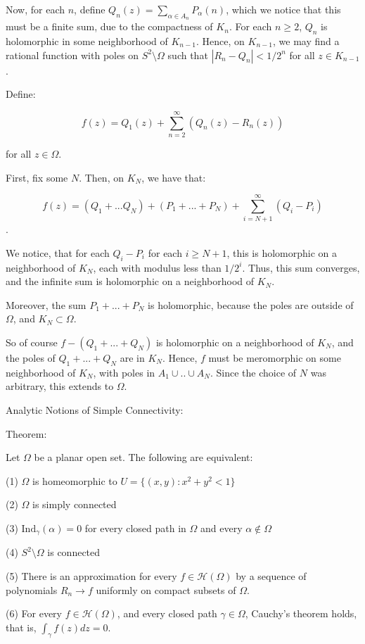 \documentclass[10pt]{article}
\newcommand{\calH}{\mathcal{H}}
\newcommand{\ind}{\text{Ind}}
\begin{document}
Now, for each $n$, define $Q_n(z) = \sum_{\alpha \in A_n} P_{\alpha}(n) $, which we notice that this must be a finite sum, due to the compactness of $K_n$. For each $n \geq 2$, $Q_n$ is holomorphic in some neighborhood of $K_{n-1}$. Hence, on $K_{n-1}$, we may find a rational function with poles on $S^2 \setminus \Omega$ such that $| R_n - Q_n | < 1/2^n$ for all $z \in K_{n-1}$. 

Define:

$$f(z) = Q_1(z) + \sum_{n=2}^\infty (Q_n(z) - R_n(z))$$

for all $z \in \Omega$.

First, fix some $N$. Then, on $K_N$, we have that:

$$ f(z) = (Q_1 + ... Q_N) + (P_1 + ... + P_N) + \sum_{i = N+1}^\infty (Q_i - P_i) $$.

We notice, that for each $Q_i - P_i$ for each $i \geq N+1$, this is holomorphic on a neighborhood of $K_N$, each with modulus less than $1/2^{i}$. Thus, this sum converges, and the infinite sum is holomorphic on a neighborhood of $K_N$. 

Moreover, the sum $P_1 + ... + P_N$ is holomorphic, because the poles are outside of $\Omega$, and $K_N \subset \Omega$. 

So of course $f - (Q_1 + ... + Q_N)$ is holomorphic on a neighborhood of $K_N$, and the poles of $Q_1 + ... + Q_N$ are in $K_N$. Hence, $f$ must be meromorphic on some neighborhood of $K_N$, with poles in $A_1 \cup .. \cup A_N$. Since the choice of $N$ was arbitrary, this extends to $\Omega$.

Analytic Notions of Simple Connectivity:

Theorem:

Let $\Omega$ be a planar open set. The following are equivalent:

(1) $\Omega$ is homeomorphic to $U = \{ (x,y) : x^2 + y^2 < 1 \}$

(2) $\Omega$ is simply connected

(3) $\ind_\gamma(\alpha) = 0$ for every closed path in $\Omega$ and every $\alpha \not \in  \Omega$

(4) $S^2 \setminus \Omega$ is connected

(5) There is an approximation for every $f \in \calH(\Omega)$ by a sequence of polynomials $R_n \to f$ uniformly on compact subsets of $\Omega$.

(6) For every $f \in \calH(\Omega)$, and every closed path $\gamma \in \Omega$, Cauchy’s theorem holds, that is, $\int_\gamma f(z) dz = 0$. 
\end{document}
